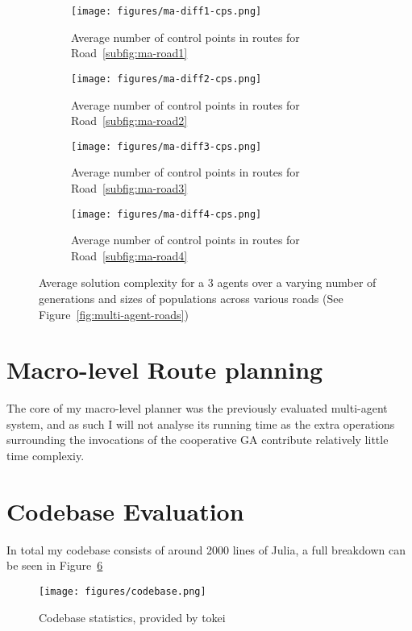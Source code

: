 \begin{figure}
  \centering
  \begin{subfigure}[b]{0.44\textwidth}
    \centering
    \texttt{[image: figures/ma-diff1-cps.png]}
    \caption{\label{subfig:ma-diff1-cps}Average number of control points in routes for Road~\ref{subfig:ma-road1}}
  \end{subfigure}
  \begin{subfigure}[b]{0.44\textwidth}
    \centering
    \texttt{[image: figures/ma-diff2-cps.png]}
    \caption{\label{subfig:ma-diff2-cps}Average number of control points in routes for Road~\ref{subfig:ma-road2}}
  \end{subfigure}
  \begin{subfigure}[b]{0.44\textwidth}
    \centering
    \texttt{[image: figures/ma-diff3-cps.png]}
    \caption{\label{subfig:ma-diff3-cps}Average number of control points in routes for Road~\ref{subfig:ma-road3}}
  \end{subfigure}
  \begin{subfigure}[b]{0.44\textwidth}
    \centering
    \texttt{[image: figures/ma-diff4-cps.png]}
    \caption{\label{subfig:ma-diff4-cps}Average number of control points in routes for Road~\ref{subfig:ma-road4}}
  \end{subfigure}
  \caption{\label{fig:multi-agent-cps} Average solution complexity for a 3 agents over a varying number of generations and sizes of populations across various roads (See Figure~\ref{fig:multi-agent-roads}) }
\end{figure}

\section{Macro-level Route planning}

The core of my macro-level planner was the previously evaluated multi-agent system, and as such I will not analyse its running time as the extra operations surrounding the invocations of the cooperative GA contribute relatively little time complexiy.

\section{Codebase Evaluation}

In total my codebase consists of around 2000 lines of Julia, a full breakdown can be seen in Figure~\ref{fig:codebase}


\begin{figure}[ht]
  \centering
  \texttt{[image: figures/codebase.png]}
  \caption{\label{fig:codebase} Codebase statistics, provided by tokei}
\end{figure}



